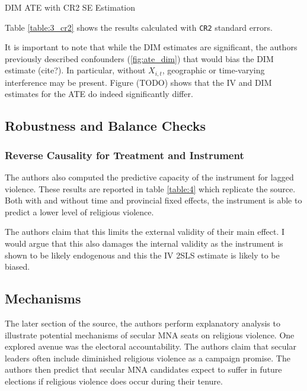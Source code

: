 \documentclass{scrartcl}
\begin{document}
\begin{table}[ht]
  \begin{center}
    \scalebox{0.75}{
      
    }
    \caption{DIM ATE with CR2 SE Estimation}
    \label{table:3_cr2}
  \end{center}
\end{table}

Table \ref{table:3_cr2} shows the results calculated with \texttt{CR2} standard errors. 

It is important to note that while the DIM estimates are significant, the authors previously described confounders (\ref{fig:ate_dim}) that would bias the DIM estimate (cite?).
In particular, without $X_{i,t}$, geographic or time-varying interference may be present.
Figure (TODO) shows that the IV and DIM estimates for the ATE do indeed significantly differ. 

\subsection{Robustness and Balance Checks}

\subsubsection{Reverse Causality for Treatment and Instrument}


The authors also computed the predictive capacity of the instrument for lagged violence.
These results are reported in table \ref{table:4} which replicate the source.
Both with and without time and provincial fixed effects, the instrument is able to predict a lower level of religious violence.

The authors claim that this limits the external validity of their main effect. I would argue that this also damages the internal validity as the instrument is shown to be likely endogenous and this the IV 2SLS estimate is likely to be biased. 


\subsection{Mechanisms}

The later section of the source, the authors perform explanatory analysis to illustrate potential mechanisms of secular MNA seats on religious violence. One explored avenue was the electoral accountability. The authors claim that secular leaders often include diminished religious violence as a campaign promise. The authors then predict that secular MNA candidates expect to suffer in future elections if religious violence does occur during their tenure. 
\end{document}
